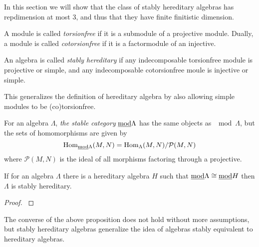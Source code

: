 In this section we will show that the class of stably hereditary algebras has repdimension at most 3, and thus that they have finite finitistic dimension.

\begin{defn}[(co)torsionfree]
	A module is called \emph{torsionfree} if it is a submodule of a projective module. Dually, a module is called \emph{cotorsionfree} if it is a factormodule of an injective.
\end{defn}

\begin{defn}
	An algebra is called \emph{stably hereditary} if any indecomposable torsionfree module is projective or simple, and any indecomposable cotorsionfree moule is injective or simple. 
\end{defn}

This generalizes the definition of hereditary algebra by also allowing simple modules to be (co)torsionfree.

\begin{defn}
	For an algebra $\Lambda$, \emph{the stable category} $\underline{\mod}\Lambda$ has the same objects as $\mod\Lambda$, but the sets of homomorphisms are given by $$\Hom_{\underline{\mod}\Lambda}(M, N) = \Hom_\Lambda(M,N)/\mathcal{P}(M,N)$$
	where $\mathcal{P}(M,N)$ is the ideal of all morphisms factoring through a projective.
\end{defn}

\begin{prop}
	If for an algebra $\Lambda$ there is a hereditary algebra $H$ such that $\underline{\mod}\Lambda \cong \underline{\mod}H$ then $\Lambda$ is stably hereditary.
	\begin{proof}
		 \cite[Chapter~IV, Theorem~1.5]{AR73}
	\end{proof}
\end{prop}

The converse of the above proposition does not hold without more assumptions, but stably hereditary algebras generalize the idea of algebras stably equivalent to hereditary algebras.

